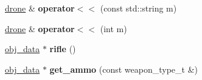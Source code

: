 \begin{DoxyCompactItemize}
\hyperlink{classmods_1_1drone}{drone} \& {\bfseries operator$<$$<$} (const std\+::string m)
\item 
\mbox{\label{classmods_1_1drone_a1933dbeaeb972c7fab4d3c7f0f335c40}} 
\hyperlink{classmods_1_1drone}{drone} \& {\bfseries operator$<$$<$} (int m)
\item 
\mbox{\label{classmods_1_1drone_afa7434fd0f3f636918f691ce6cb62967}} 
\hyperlink{structobj__data}{obj\+\_\+data} $\ast$ {\bfseries rifle} ()
\item 
\mbox{\label{classmods_1_1drone_a401163c68d0624fc2ca64468b306564d}} 
\hyperlink{structobj__data}{obj\+\_\+data} $\ast$ {\bfseries get\+\_\+ammo} (const weapon\+\_\+type\+\_\+t \&)
\end{DoxyCompactItemize}
